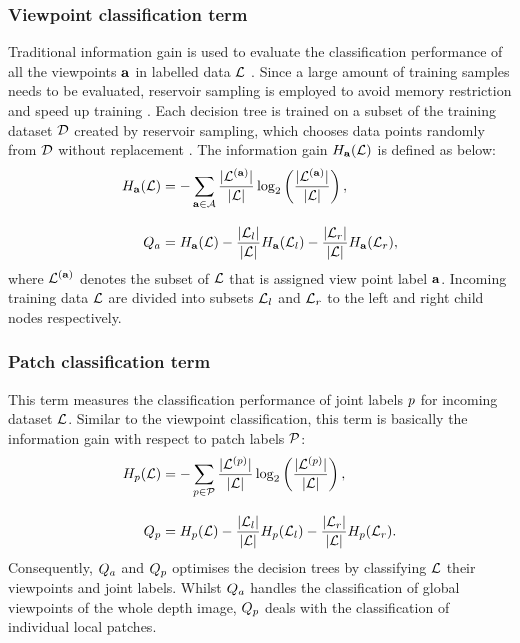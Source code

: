 \subsubsection{Viewpoint classification term} 


Traditional information gain is used to evaluate the classification performance of all the viewpoints $\mathbf{a}$ in labelled data $\mathcal{L}$ \cite{Breiman2001}.   
Since a large amount of training samples needs to be evaluated, reservoir sampling is employed to avoid memory restriction and speed up training \cite{Girshick2011}. 
Each decision tree is trained on a subset of the training dataset $\mathcal{D}$ created by reservoir sampling, which chooses data points randomly from $\mathcal{D}$ without replacement \cite{Vitter1985}. 
The information gain $H_{\mathbf{a}}(\mathcal{L})$ is defined as below:
\begin{equation}
	\label{eqn/hand/viewterm}
	\begin{aligned}
		H_{\mathbf{a}}(\mathcal{L}) & = 
		- \displaystyle\sum_{\mathbf{a} \in \mathcal{A}} \frac{|\mathcal{L}^{(\mathbf{a})}|}{|\mathcal{L}|}\log_{2}\left(\frac{|\mathcal{L}^{(\mathbf{a})}|}{|\mathcal{L}|}\right), \\[3mm] 
		Q_{a} & = 
		H_{\mathbf{a}}(\mathcal{L}) - 
		\frac{|\mathcal{L}_{l}|}{|\mathcal{L}|} H_{\mathbf{a}}(\mathcal{L}_{l}) -  
		\frac{|\mathcal{L}_{r}|}{|\mathcal{L}|} H_{\mathbf{a}}(\mathcal{L}_{r}),
	\end{aligned}
\end{equation}
where $\mathcal{L}^{(\mathbf{a})}$ denotes the subset of $\mathcal{L}$ that is assigned view point label $\mathbf{a}$. Incoming training data $\mathcal{L}$ are divided into subsets $\mathcal{L}_{l}$ and $\mathcal{L}_{r}$ to the left and right child nodes respectively.  

\subsubsection{Patch classification term} 
This term measures the classification performance of joint labels $p$ for incoming dataset $\mathcal{L}$. Similar to the viewpoint classification, this term is basically the information gain with respect to patch labels $\mathcal{P}$:  
\begin{equation}
	\begin{aligned}	
		H_{p}(\mathcal{L}) & = 
		- \displaystyle\sum_{p \in \mathcal{P}} \frac{|\mathcal{L}^{(p)}|}{|\mathcal{L}|}\log_{2}\left(\frac{|\mathcal{L}^{(p)}|}{|\mathcal{L}|}\right), \\[3mm]
	Q_{p} & = 
	H_{p}(\mathcal{L}) - 
	\frac{|\mathcal{L}_{l}|}{|\mathcal{L}|} H_{p}(\mathcal{L}_{l}) -  
	\frac{|\mathcal{L}_{r}|}{|\mathcal{L}|} H_{p}(\mathcal{L}_{r}).
	\end{aligned}
	\label{eqn/hand/classterm}
\end{equation}
Consequently, $Q_{a}$ and $Q_{p}$ optimises the decision trees by classifying $\mathcal{L}$ their viewpoints and joint labels. Whilst $Q_{a}$ handles the classification of global viewpoints of the whole depth image, $Q_{p}$ deals with the classification of individual local patches. 

